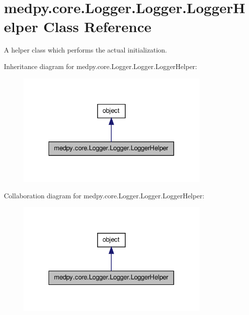 \hypertarget{classmedpy_1_1core_1_1Logger_1_1Logger_1_1LoggerHelper}{
\section{medpy.core.Logger.Logger.LoggerHelper Class Reference}
\label{classmedpy_1_1core_1_1Logger_1_1Logger_1_1LoggerHelper}
}


A helper class which performs the actual initialization.  




Inheritance diagram for medpy.core.Logger.Logger.LoggerHelper:\nopagebreak
\begin{figure}[H]
\begin{center}
\leavevmode
\includegraphics[width=272pt]{classmedpy_1_1core_1_1Logger_1_1Logger_1_1LoggerHelper__inherit__graph}
\end{center}
\end{figure}


Collaboration diagram for medpy.core.Logger.Logger.LoggerHelper:\nopagebreak
\begin{figure}[H]
\begin{center}
\leavevmode
\includegraphics[width=272pt]{classmedpy_1_1core_1_1Logger_1_1Logger_1_1LoggerHelper__coll__graph}
\end{center}
\end{figure}
